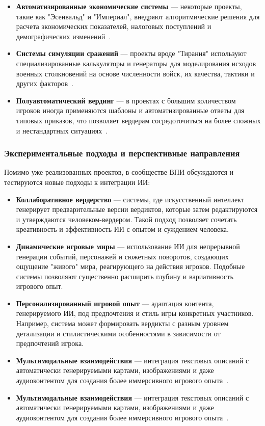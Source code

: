 \begin{itemize}
    \item \textbf{Автоматизированные экономические системы} — некоторые проекты, такие как "Эсенвальд" и "Империал", внедряют алгоритмические решения для расчета экономических показателей, налоговых поступлений и демографических изменений~\cite{wpg-automation}.

    \item \textbf{Системы симуляции сражений} — проекты вроде "Тирания" используют специализированные калькуляторы и генераторы для моделирования исходов военных столкновений на основе численности войск, их качества, тактики и других факторов~\cite{battle-automation}.

    \item \textbf{Полуавтоматический вердинг} — в проектах с большим количеством игроков иногда применяются шаблоны и автоматизированные ответы для типовых приказов, что позволяет вердерам сосредоточиться на более сложных и нестандартных ситуациях~\cite{wpg-semiauto}.
\end{itemize}

\subsubsection{Экспериментальные подходы и перспективные направления}

Помимо уже реализованных проектов, в сообществе ВПИ обсуждаются и тестируются новые подходы к интеграции ИИ:

\begin{itemize}
    \item \textbf{Коллаборативное вердерство} — системы, где искусственный интеллект генерирует предварительные версии вердиктов, которые затем редактируются и утверждаются человеком-вердером. Такой подход позволяет сочетать креативность и эффективность ИИ с опытом и суждением человека.

    \item \textbf{Динамические игровые миры} — использование ИИ для непрерывной генерации событий, персонажей и сюжетных поворотов, создающих ощущение "живого" мира, реагирующего на действия игроков. Подобные системы позволяют существенно расширить глубину и вариативность игрового опыт.

    \item \textbf{Персонализированный игровой опыт} — адаптация контента, генерируемого ИИ, под предпочтения и стиль игры конкретных участников. Например, система может формировать вердикты с разным уровнем детализации и стилистическими особенностями в зависимости от предпочтений игрока.

    \item \textbf{Мультимодальные взаимодействия} — интеграция текстовых описаний с автоматически генерируемыми картами, изображениями и даже аудиоконтентом для создания более иммерсивного игрового опыта~\cite{catalogwpg2023}.
    \item \textbf{Мультимодальные взаимодействия} — интеграция текстовых описаний с автоматически генерируемыми картами, изображениями и даже аудиоконтентом для создания более иммерсивного игрового опыта~\cite{catalogwpg2023}.
\end{itemize}

